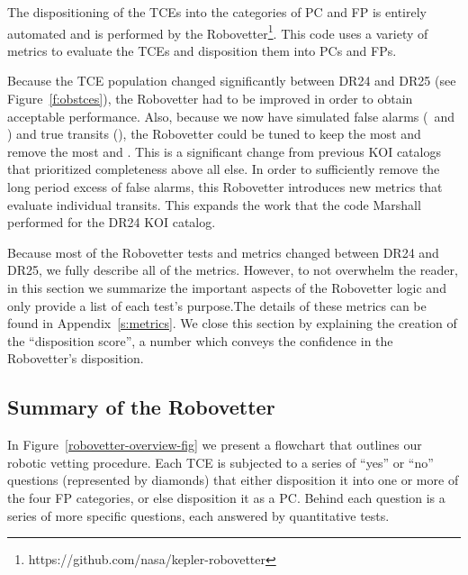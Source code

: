 \label{s:robovetter}
The dispositioning of the TCEs into the categories of PC and FP is entirely automated and is performed by the Robovetter\footnote{https://github.com/nasa/kepler-robovetter}. This code uses a variety of metrics to evaluate the TCEs and disposition them into PCs and FPs.  


Because the TCE population changed significantly between DR24 and DR25 (see Figure~\ref{f:obstces}), the Robovetter had to be improved in order to obtain acceptable performance.  Also, because we now have simulated false alarms (\invtce\ and \scrtce) and true transits (\injtce), the Robovetter could be tuned to keep the most  and remove the most  and . This is a significant change from previous KOI catalogs that prioritized completeness above all else.  In order to sufficiently remove the long period excess of false alarms, this Robovetter introduces new metrics that evaluate individual transits. This expands the work that the code Marshall \citep{Mullally2015c} performed for the DR24 KOI catalog.

Because most of the Robovetter tests and metrics changed between DR24 and DR25, we fully describe all of the metrics.  However, to not overwhelm the reader, in this section we summarize the important aspects of the Robovetter logic and only provide a list of each test's purpose.The details of these metrics can be found in Appendix~\ref{s:metrics}. We close this section by explaining the creation of the ``disposition score'', a number which conveys the confidence in the Robovetter's disposition.

\subsection{Summary of the Robovetter}

In Figure~\ref{robovetter-overview-fig} we present a flowchart that outlines our robotic vetting procedure. Each TCE is subjected to a series of ``yes'' or ``no'' questions (represented by diamonds) that either disposition it into one or more of the four FP categories, or else disposition it as a PC. Behind each question is a series of more specific questions, each answered by quantitative tests. 


